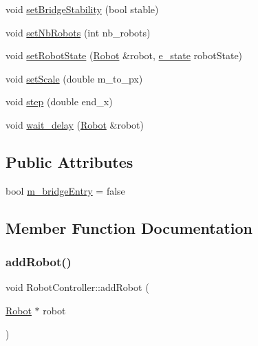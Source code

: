 \begin{DoxyCompactItemize}
\item 
void \mbox{\hyperlink{class_robot_controller_a19191b156161bd7a3978659329ceaad2}{set\+Bridge\+Stability}} (bool stable)
\item 
void \mbox{\hyperlink{class_robot_controller_adf00a753bc750624e805f57f8998ad78}{set\+Nb\+Robots}} (int nb\+\_\+robots)
\item 
void \mbox{\hyperlink{class_robot_controller_a797837410a2802b5d7399d132924ba2c}{set\+Robot\+State}} (\mbox{\hyperlink{class_robot}{Robot}} \&robot, \mbox{\hyperlink{_robot_8h_a74a75e4700f1f71bb89d80765319e57b}{e\+\_\+state}} robot\+State)
\item 
void \mbox{\hyperlink{class_robot_controller_a76d6bb1e93bb9523850370fdf76407c4}{set\+Scale}} (double m\+\_\+to\+\_\+px)
\item 
void \mbox{\hyperlink{class_robot_controller_ab2e4091fc2e47701cc5dbd7c2d9fc649}{step}} (double end\+\_\+x)
\item 
void \mbox{\hyperlink{class_robot_controller_ae433d7a77a59e8eced35fc4885051805}{wait\+\_\+delay}} (\mbox{\hyperlink{class_robot}{Robot}} \&robot)
\end{DoxyCompactItemize}
\subsection*{Public Attributes}
\begin{DoxyCompactItemize}
\item 
bool \mbox{\hyperlink{class_robot_controller_abe09204acb8936eddcacbae0b023423a}{m\+\_\+bridge\+Entry}} = false
\end{DoxyCompactItemize}


\subsection{Member Function Documentation}
\mbox{\label{class_robot_controller_a1e3c66846d346e125954dd30bec8ac50}} 
\subsubsection{\texorpdfstring{add\+Robot()}{addRobot()}}
{\footnotesize\ttfamily void Robot\+Controller\+::add\+Robot (\begin{DoxyParamCaption}\item[{\mbox{\hyperlink{class_robot}{Robot}} $\ast$}]{robot }\end{DoxyParamCaption})}

